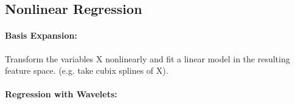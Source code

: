 \subsection{Nonlinear Regression}
\paragraph{Basis Expansion: }
Transform the variables X nonlinearly and fit a linear model in the resulting feature space. (e.g. take cubix splines of X).

\paragraph{Regression with Wavelets: }
